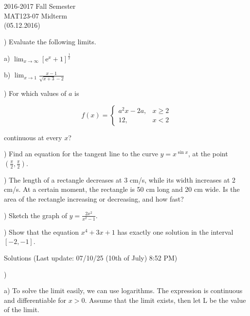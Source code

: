 \documentclass{article}
\begin{document}
\large

\begin{center}
2016-2017 Fall Semester\\MAT123-07 Midterm\\(05.12.2016)
\end{center}

) Evaluate the following limits.

\hfill

\noindent a) $\displaystyle \lim_{x \to \infty} [\mathrm{e}^x + 1]^{\frac{1}{x}}$

\hfill

\noindent b) $\displaystyle \lim_{x \to 1} \frac{x-1}{\sqrt{x+3} - 2}$

\hfill

) For which values of $a$ is

\[
f(x) =
\begin{cases}
a^2x - 2a, & x \geq 2 \\
12,  & x < 2
\end{cases}
\]

\noindent continuous at every $x$?

\hfill

) Find an equation for the tangent line to the curve $ y = x^{\sin x}$, at the point $(\frac{\pi}{2}, \frac{\pi}{2})$.

\hfill

) The length of a rectangle decreases at 3 cm/s, while its width increases at 2 cm/s. At a certain moment, the rectangle is 50 cm long and 20 cm wide. Is the area of the rectangle increasing or decreasing, and how fast?

\hfill

) Sketch the graph of $\displaystyle y = \frac{2x^2}{x^2-1}$.

\hfill

) Show that the equation $x^4 + 3x + 1$ has exactly one solution in the interval $[-2, -1]$.

\newpage

\begin{center}
Solutions (Last update: 07/10/25 (10th of July) 8:52 PM)
\end{center}

)

\hfill

\noindent a) To solve the limit easily, we can use logarithms. The expression is continuous and differentiable for $x > 0$. Assume that the limit exists, then let L be the value of the limit.
\end{document}
